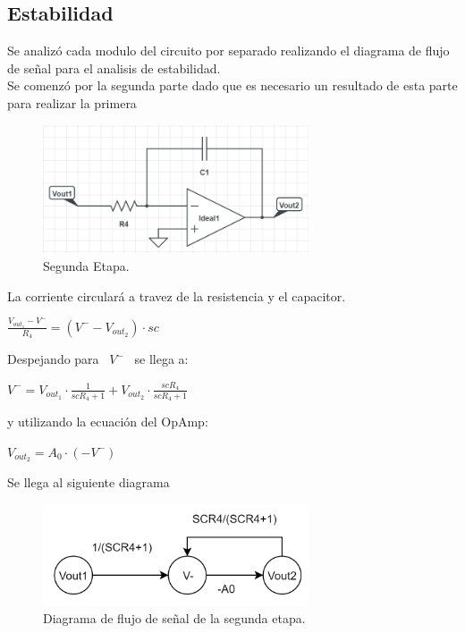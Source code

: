 \subsection{Estabilidad}
Se analizó cada modulo del circuito por separado realizando el diagrama de flujo de señal para el analisis de estabilidad.\\
Se comenzó por la segunda parte dado que es necesario un resultado de esta parte para realizar la primera

\begin{figure}[htb]	
	\centering
	\includegraphics[width=0.7\textwidth]{imagenes/SegundaEtapa.PNG}
	\caption{Segunda Etapa.}
	\label{fig:SegundaEtapa}
\end{figure}
La corriente circulará a travez de la resistencia y el capacitor.\\
\begin{center}
$ \frac{V_{out_1}-V^-}{R_4} = (V^--V_{out_2})\cdot sc$ \\
\end{center}
 Despejando para \ $V^-$ \ se llega a: \\
\begin{center}
$V^- = V_{out_1} \cdot \frac{1}{scR_4+1}+V_{out_2} \cdot \frac{scR_4}{scR_4+1}$\\\end{center}
y utilizando la ecuación del OpAmp:\\
\begin{center}
$V_{out_2}=A_0 \cdot (-V^-)$
\end{center}
Se llega al siguiente diagrama
\begin{figure}[H]	
	\centering
	\includegraphics[width=0.7\textwidth]{imagenes/SegundaEtapaDiagrama.PNG}
	\caption{Diagrama de flujo de señal de la segunda etapa.}
	\label{fig:SegundaEtapaDiagrama}
\end{figure}

